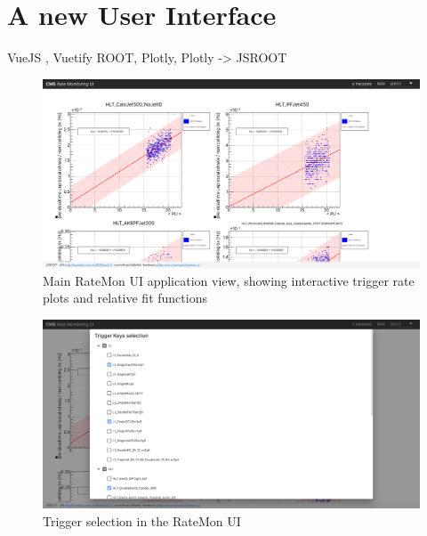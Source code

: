 \section{A new User Interface}

VueJS \cite{Vuejs-2020-10-04}, Vuetify \cite{VuetifyAMaterialDesignFrameworkforVuejs-2020-10-04} ROOT, Plotly, Plotly -> JSROOT \cite{JavaScriptROOT-2020-05-07}

\begin{figure}
    \centerline{
        \includegraphics[width=0.9\paperwidth]{figures/ratemon-ui0.png}}
    \caption{Main RateMon UI application view, showing interactive trigger rate plots and relative fit functions}
    \label{fig:ratemon_ui0}
\end{figure}

\begin{figure}
    \centerline{
        \includegraphics[width=0.9\paperwidth]{figures/ratemon-ui1.png}}
    \caption{Trigger selection in the RateMon UI}
    \label{fig:ratemon_ui0}
\end{figure}